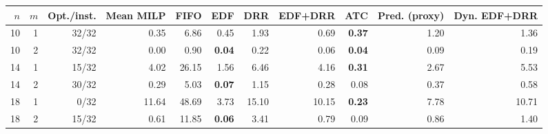 \begin{tabular}{rrrrrrrrrrr}
\toprule
$n$ & $m$ & Opt./inst. & Mean MILP & FIFO & EDF & DRR & EDF+DRR & ATC & Pred. (proxy) & Dyn. EDF+DRR \\
\midrule
10 & 1 & 32/32 & 0.35 & 6.86 & 0.45 & 1.93 & 0.69 & \textbf{0.37} & 1.20 & 1.36 \\
10 & 2 & 32/32 & 0.00 & 0.90 & \textbf{0.04} & 0.22 & 0.06 & \textbf{0.04} & 0.09 & 0.19 \\
14 & 1 & 15/32 & 4.02 & 26.15 & 1.56 & 6.46 & 4.16 & \textbf{0.31} & 2.67 & 5.53 \\
14 & 2 & 30/32 & 0.29 & 5.03 & \textbf{0.07} & 1.15 & 0.28 & 0.08 & 0.37 & 0.58 \\
18 & 1 & 0/32 & 11.64 & 48.69 & 3.73 & 15.10 & 10.15 & \textbf{0.23} & 7.78 & 10.71 \\
18 & 2 & 15/32 & 0.61 & 11.85 & \textbf{0.06} & 3.41 & 0.79 & 0.09 & 0.86 & 1.40 \\
\bottomrule
\end{tabular}
